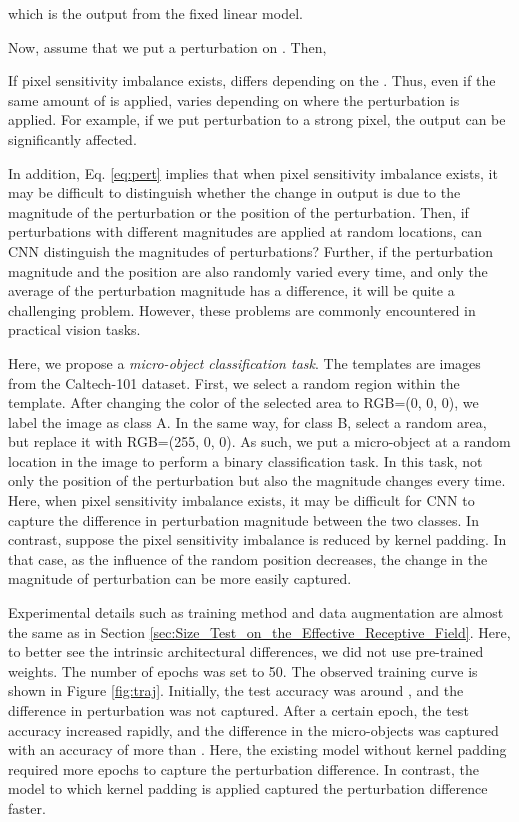 \documentclass[letterpaper]{article} \usepackage{aaai22}  \usepackage{times}  \usepackage{helvet}  \usepackage{courier}  \usepackage[hyphens]{url}  \usepackage{graphicx} \urlstyle{rm} \def\UrlFont{\rm}  \usepackage{natbib}  \usepackage{caption} \DeclareCaptionStyle{ruled}{labelfont=normalfont,labelsep=colon,strut=off} \frenchspacing  \setlength{\pdfpagewidth}{8.5in}  \setlength{\pdfpageheight}{11in}  \usepackage{algorithm}
\begin{document}
which is the output from the fixed linear model.

Now, assume that we put a perturbation  on . Then,


If pixel sensitivity imbalance exists,  differs depending on the . Thus, even if the same amount of  is applied,  varies depending on where the perturbation is applied. For example, if we put perturbation to a strong pixel, the output can be significantly affected.

In addition, Eq. \ref{eq:pert} implies that when pixel sensitivity imbalance exists, it may be difficult to distinguish whether the change in output is due to the magnitude of the perturbation or the position of the perturbation. Then, if perturbations with different magnitudes are applied at random locations, can CNN distinguish the magnitudes of perturbations? Further, if the perturbation magnitude and the position are also randomly varied every time, and only the average of the perturbation magnitude has a difference, it will be quite a challenging problem. However, these problems are commonly encountered in practical vision tasks.

Here, we propose a \textit{micro-object classification task}. The templates are images from the Caltech-101 dataset. First, we select a random  region within the template. After changing the color of the selected area to RGB=(0, 0, 0), we label the image as class A. In the same way, for class B, select a random area, but replace it with RGB=(255, 0, 0). As such, we put a micro-object at a random location in the image to perform a binary classification task. In this task, not only the position of the perturbation but also the magnitude changes every time. Here, when pixel sensitivity imbalance exists, it may be difficult for CNN to capture the difference in perturbation magnitude between the two classes. In contrast, suppose the pixel sensitivity imbalance is reduced by kernel padding. In that case, as the influence of the random position decreases, the change in the magnitude of perturbation can be more easily captured.

Experimental details such as training method and data augmentation are almost the same as in Section \ref{sec:Size_Test_on_the_Effective_Receptive_Field}. Here, to better see the intrinsic architectural differences, we did not use pre-trained weights. The number of epochs was set to 50. The observed training curve is shown in Figure \ref{fig:traj}. Initially, the test accuracy was around , and the difference in perturbation was not captured. After a certain epoch, the test accuracy increased rapidly, and the difference in the micro-objects was captured with an accuracy of more than . Here, the existing model without kernel padding required more epochs to capture the perturbation difference. In contrast, the model to which kernel padding is applied captured the perturbation difference faster.
\end{document}
